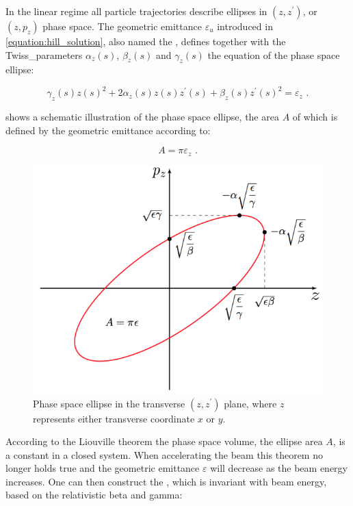 In the linear regime all particle trajectories describe ellipses in \((z, z^{\prime})\), or \((z, p_z)\) phase space.
The geometric emittance \(\varepsilon_u\) introduced in \cref{equation:hill_solution}, also named the , defines together with the \gls{Twiss_parameters} \(\alpha_z(s)\), \(\beta_z(s)\) and \(\gamma_z(s)\) the equation of the phase space ellipse:

\begin{equation}
    \gamma_z(s) z(s)^{2} + 2 \alpha_z(s) z(s) z^{\prime}(s) + \beta_z(s) z^{\prime}(s)^{2} = \varepsilon_z \text{ .}
    \label{equation:ellipse_equation}
\end{equation}

 shows a schematic illustration of the phase space ellipse, the area \(A\) of which is defined by the geometric emittance according to:

\begin{equation}
    A = \pi \varepsilon_z \text{ .}
    \label{equation:phase_space_ellipse_area}
\end{equation}

\begin{figure}[!htb]
    \centering
    \includegraphics[width = 0.75\linewidth]{Figures/Beam_Dynamics_Theory/phase_space.png}
    \caption{Phase space ellipse in the transverse \((z, z^{\prime})\) plane, where \(z\) represents either transverse coordinate \(x\) or \(y\).}
    \label{figure:phase_space_ellipse}
\end{figure}

According to the Liouville theorem the phase space volume, the ellipse area \(A\), is a constant in a closed system.
When accelerating the beam this theorem no longer holds true and the geometric emittance \(\varepsilon\) will decrease as the beam energy increases.
One can then construct the , which is invariant with beam energy, based on the relativistic beta and gamma:

